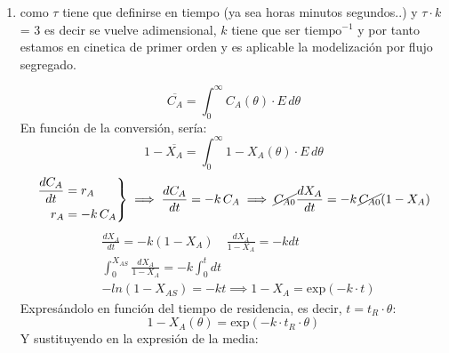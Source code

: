 \begin{enumerate}[label={\alph*)}]

	\item como $\tau$ tiene que definirse en tiempo (ya sea horas minutos segundos..) y $\tau \cdot k$ = 3 es decir se vuelve adimensional, $k$ tiene que ser $\text{tiempo}^{-1}$ y por tanto estamos en cinetica de primer orden y es aplicable la modelización por flujo segregado.

	      \begin{equation*}
		      \overline{C_A} = \int_{0}^{\infty} C_A(\theta) \cdot E \, d\theta
	      \end{equation*}
	      En función de la conversión, sería:
	      \begin{equation*}
		      1 -\overline{X_A} = \int_{0}^{\infty} 1 - X_A(\theta) \cdot E \, d\theta
	      \end{equation*}
	      \begin{align*}
		      \left.\begin{aligned}
			            \frac{dC_A}{dt} & = r_A     \\
			            r_A             & = -k\,C_A
		            \end{aligned}\right\}
		      \implies \frac{dC_A}{dt} = -k\,C_A
		      \implies \cancel{C_{A0}}\frac{dX_A}{dt} = -k\,\cancel{C_{A0}}(1-X_A)
	      \end{align*}
	      \begin{align*}
		       & \frac{dX_A}{dt}                       = -k(1-X_A)\quad \frac{dX_A}{1-X_A} = -k dt  \\[6pt]
		       & \int_{0}^{X_{AS}} \frac{dX_A}{1-X_A}  = -k \int_{0}^{t} dt                         \\[6pt]
		       & -ln(1-X_{AS})                         = -kt \implies 1-X_A = \text{exp}(-k\cdot t)
	      \end{align*}
	      Expresándolo en función del tiempo de residencia, es decir, $t = t_R \cdot \theta$:
	      \begin{equation*}
		      \boxed{1-X_A(\theta) = \text{exp}(-k\cdot t_R \cdot \theta)}
	      \end{equation*}
	      Y sustituyendo en la expresión de la media:

\end{enumerate}
